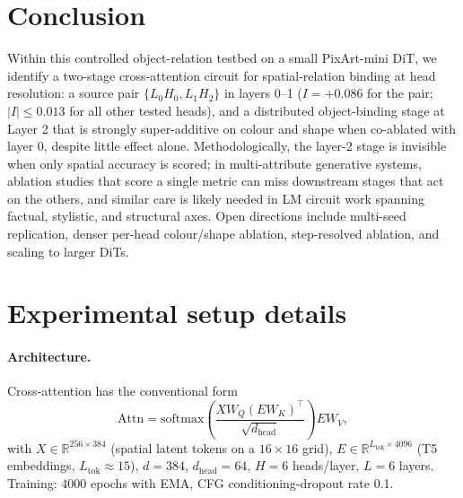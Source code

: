 \documentclass{article}
\begin{document}
\section{Conclusion}

Within this controlled object-relation testbed on a small PixArt-mini DiT, we identify a two-stage cross-attention circuit for spatial-relation binding at head resolution: a source pair $\{L_0H_0, L_1H_2\}$ in layers 0--1 ($I = +0.086$ for the pair; $|I| \leq 0.013$ for all other tested heads), and a distributed object-binding stage at Layer 2 that is strongly super-additive on colour and shape when co-ablated with layer 0, despite little effect alone. Methodologically, the layer-2 stage is invisible when only spatial accuracy is scored; in multi-attribute generative systems, ablation studies that score a single metric can miss downstream stages that act on the others, and similar care is likely needed in LM circuit work spanning factual, stylistic, and structural axes. Open directions include multi-seed replication, denser per-head colour/shape ablation, step-resolved ablation, and scaling to larger DiTs.





\newpage
\appendix


\section{Experimental setup details}
\label{app:setup}

\paragraph{Architecture.} Cross-attention has the conventional form
\begin{equation}
\mathrm{Attn} = \mathrm{softmax}\!\left(\frac{XW_Q (EW_K)^\top}{\sqrt{d_\text{head}}}\right) EW_V,
\end{equation}
with $X\!\in\!\mathbb{R}^{256\times 384}$ (spatial latent tokens on a $16{\times}16$ grid), $E\!\in\!\mathbb{R}^{L_\text{tok}\times 4096}$ (T5 embeddings, $L_\text{tok}\!\approx\!15$), $d{=}384$, $d_\text{head}{=}64$, $H{=}6$ heads/layer, $L{=}6$ layers. Training: 4000 epochs with EMA, CFG conditioning-dropout rate 0.1.
\end{document}
